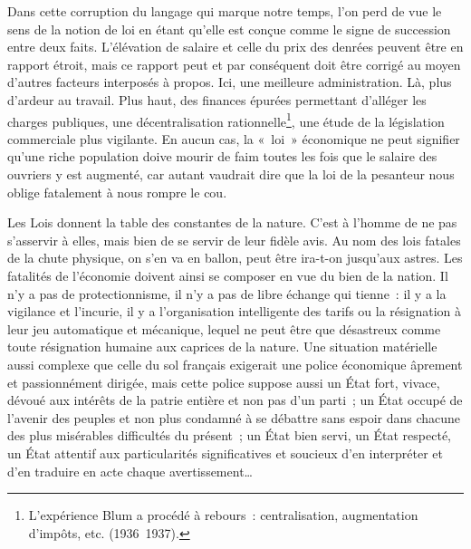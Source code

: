\documentclass[french,twoside]{book} %
\begin{document}
\noindent Dans cette corruption du langage qui marque notre temps, l’on perd de vue le sens de la notion de loi en étant qu’elle est conçue comme le signe de succession entre deux faits. L’élévation de salaire et celle du prix des denrées peuvent être en rapport étroit, mais ce rapport peut et par conséquent doit être corrigé au moyen d’autres facteurs interposés à propos. Ici, une meilleure administration. Là, plus d’ardeur au travail. Plus haut, des finances épurées permettant d’alléger les charges publiques, une décentralisation rationnelle\footnote{L’expérience Blum a procédé à rebours : centralisation, augmentation d’impôts, etc. (1936 1937).}, une étude de la législation commerciale plus vigilante. En aucun cas, la « loi » économique ne peut signifier qu’une riche population doive mourir de faim toutes les fois que le salaire des ouvriers y est augmenté, car autant vaudrait dire que la loi de la pesanteur nous oblige fatalement à nous rompre le cou.\par
Les Lois donnent la table des constantes de la nature. C’est à l’homme de ne pas s’asservir à elles, mais bien de se servir de leur fidèle avis. Au nom des lois fatales de la chute physique, on s’en va en ballon, peut être ira-t-on jusqu’aux astres. Les fatalités de l’économie doivent ainsi se composer en vue du bien de la nation. Il n’y a pas de protectionnisme, il n’y a pas de libre échange qui tienne : il y a la vigilance et l’incurie, il y a l’organisation intelligente des tarifs ou la résignation à leur jeu automatique et mécanique, lequel ne peut être que désastreux comme toute résignation humaine aux caprices de la nature. Une situation matérielle aussi complexe que celle du sol français exigerait une police économique âprement et passionnément dirigée, mais cette police suppose aussi un État fort, vivace, dévoué aux intérêts de la patrie entière et non pas d’un parti ; un État occupé de l’avenir des peuples et non plus condamné à se débattre sans espoir dans chacune des plus misérables difficultés du présent ; un État bien servi, un État respecté, un État attentif aux particularités significatives et soucieux d’en interpréter et d’en traduire en acte chaque avertissement…
\end{document}
